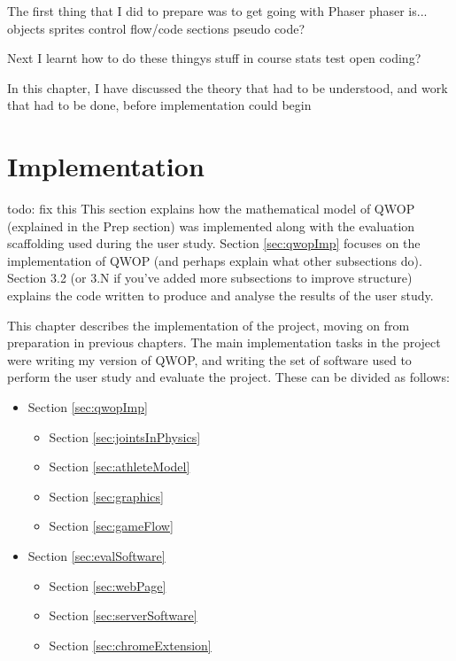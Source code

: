 \documentclass[12pt,a4paper,twoside,openright]{report}
\begin{document}
The first thing that I did to prepare was to get going with Phaser
phaser is...
	objects sprites
	control flow/code sections
		pseudo code?

Next I learnt how to do these thingys
stuff in course
	stats test
	open coding?

In this chapter, I have discussed the theory that had to be understood, and work that
had to be done, before implementation could begin




\chapter{Implementation}
todo: fix this
This section explains how the mathematical model of QWOP (explained in the Prep section) was implemented along with the evaluation scaffolding used during the user study.  Section \ref{sec:qwopImp} focuses on the implementation of QWOP (and perhaps explain what other subsections do). Section 3.2 (or 3.N if you've added more subsections to improve structure) explains the code written to produce and analyse the results of the user study.

This chapter describes the implementation of the project, moving on from preparation in previous chapters. The main implementation tasks in the project were writing my version of QWOP, and writing the set of software used to perform the user study and evaluate the project. These can be divided as follows:

\begin{itemize}
  \item Section \ref{sec:qwopImp} 
	\begin{itemize}
      \item Section \ref{sec:jointsInPhysics} 
  	  \item Section \ref{sec:athleteModel} 
  	  \item Section \ref{sec:graphics} 
  	  \item Section \ref{sec:gameFlow} 
	\end{itemize}
  \item Section \ref{sec:evalSoftware} 
   \begin{itemize}
      \item Section \ref{sec:webPage} 
      \item Section \ref{sec:serverSoftware} 
      \item Section \ref{sec:chromeExtension} 
    \end{itemize}
\end{itemize}
\end{document}
